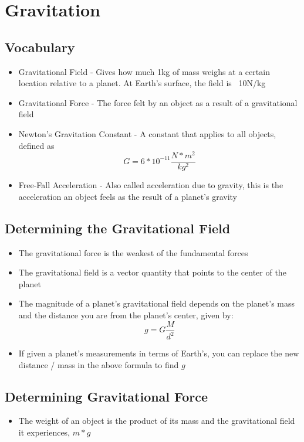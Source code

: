 \section{Gravitation}

\subsection{Vocabulary}
\begin{itemize}
    \item Gravitational Field - Gives how much 1kg of mass weighs at a certain location relative to a planet. At Earth's surface, the field is ~10N/kg
    \item Gravitational Force - The force felt by an object as a result of a gravitational field
    \item Newton's Gravitation Constant - A constant that applies to all objects, defined as \[G=6*10^{-11}\frac{N*m^2}{kg^2}\]
    \item Free-Fall Acceleration - Also called acceleration due to gravity, this is the acceleration an object feels as the result of a planet's gravity
\end{itemize}

\subsection{Determining the Gravitational Field}
\begin{itemize}
    \item The gravitational force is the weakest of the fundamental forces
    \item The gravitational field is a vector quantity that points to the center of the planet
    \item The magnitude of a planet's gravitational field depends on the planet's mass and the distance you are from the planet's center, given by: \[g=G\frac{M}{d^2}\]
    \item If given a planet's measurements in terms of Earth's, you can replace the new distance / mass in the above formula to find \(g\)
\end{itemize}

\subsection{Determining Gravitational Force}
\begin{itemize}
    \item The weight of an object is the product of its mass and the gravitational field it experiences, \(m*g\)
\end{itemize}


